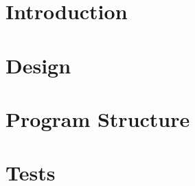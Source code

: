 %
\tableofcontents%
%
\mainmatter%
%
\chapter{Introduction}







\chapter{Design}
\label{sec:design}









\chapter{Program Structure}
\label{sec:structure}


















 


\chapter{Tests}
\label{sec:tests}









